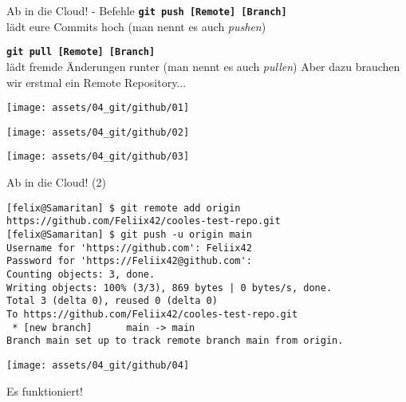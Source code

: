 \begin{frame}{Ab in die Cloud! - Befehle}
	\centering \Large \textbf{\alert{\texttt{git push [Remote] [Branch]}}} \\[.2cm]
	\normalsize lädt eure Commits hoch (man nennt es auch \emph{pushen})
	\vfill

	\Large \textbf{\alert{\texttt{git pull [Remote] [Branch]}}} \\[.2cm]
	\normalsize lädt fremde Änderungen runter (man nennt es auch \emph{pullen})
	\vfill
	\pause{}
	Aber dazu brauchen wir erstmal ein Remote Repository...
\end{frame}

\begin{frame}
	\centering \texttt{[image: assets/04\_git/github/01]}
\end{frame}

\begin{frame}
	\centering \texttt{[image: assets/04\_git/github/02]}
\end{frame}

\begin{frame}
	\centering \texttt{[image: assets/04\_git/github/03]}
\end{frame}

\begin{frame}[fragile]{Ab in die Cloud! (2)}
	\begin{lstlisting}
[felix@Samaritan] $ git remote add origin https://github.com/Feliix42/cooles-test-repo.git
[felix@Samaritan] $ git push -u origin main
Username for 'https://github.com': Feliix42
Password for 'https://Feliix42@github.com':
Counting objects: 3, done.
Writing objects: 100% (3/3), 869 bytes | 0 bytes/s, done.
Total 3 (delta 0), reused 0 (delta 0)
To https://github.com/Feliix42/cooles-test-repo.git
 * [new branch]      main -> main
Branch main set up to track remote branch main from origin.
\end{lstlisting}
\end{frame}

\begin{frame}
	\centering \texttt{[image: assets/04\_git/github/04]}

	Es funktioniert!
\end{frame}


